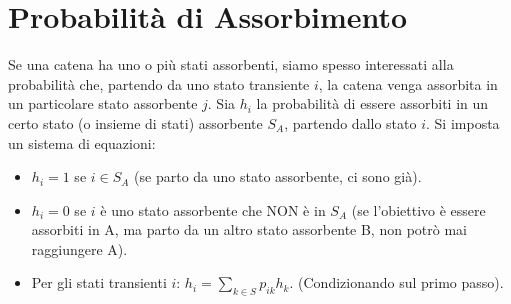 \section{Probabilità di Assorbimento}
Se una catena ha uno o più stati assorbenti, siamo spesso interessati alla probabilità che, partendo da uno stato transiente $i$, la catena venga assorbita in un particolare stato assorbente $j$.
Sia $h_i$ la probabilità di essere assorbiti in un certo stato (o insieme di stati) assorbente $S_A$, partendo dallo stato $i$.
Si imposta un sistema di equazioni:
\begin{itemize}
    \item $h_i = 1$ se $i \in S_A$ (se parto da uno stato assorbente, ci sono già).
    \item $h_i = 0$ se $i$ è uno stato assorbente che NON è in $S_A$ (se l'obiettivo è essere assorbiti in A, ma parto da un altro stato assorbente B, non potrò mai raggiungere A).
    \item Per gli stati transienti $i$: $h_i = \sum_{k \in S} p_{ik} h_k$. (Condizionando sul primo passo).
\end{itemize}
